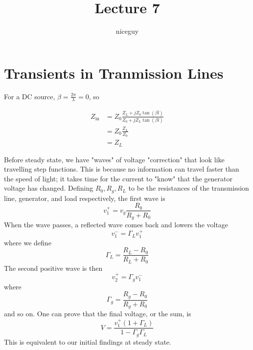 \documentclass[12pt]{article}
\title{Lecture 7}
\author{niceguy}
\begin{document}
\maketitle

\section{Transients in Tranmission Lines}

For a DC source, $\beta = \frac{2\pi}{\lambda} = 0$, so

\begin{align*}
    Z_{\text{in}} &= Z_0 \frac{Z_L + jZ_0\tan(\beta l)}{Z_0 + jZ_L \tan(\beta l)} \\
           &= Z_0 \frac{Z_L}{Z_0} \\
           &= Z_L
\end{align*}

Before steady state, we have "waves" of voltage "correction" that look like travelling step functions. This is because no information can travel faster than the speed of light; it takes time for the current to "know" that the generator voltage has changed. Defining $R_0, R_g, R_L$ to be the resistances of the transmission line, generator, and load respectively, the first wave is
$$v_1^+ = v_g \frac{R_0}{R_g + R_0}$$
When the wave passes, a reflected wave comes back and lowers the voltage
$$v_1^- = \Gamma_L v_1^+$$
where we define
$$\Gamma_L = \frac{R_L - R_0}{R_L + R_0}$$
The second positive wave is then
$$v_2^+ = \Gamma_g v_1^-$$
where
$$\Gamma_g = \frac{R_g - R_0}{R_g + R_0}$$
and so on. One can prove that the final voltage, or the sum, is
$$V = \frac{v_1^+(1+\Gamma_L)}{1 - \Gamma_g\Gamma_L}$$
This is equivalent to our initial findings at steady state.
\end{document}
